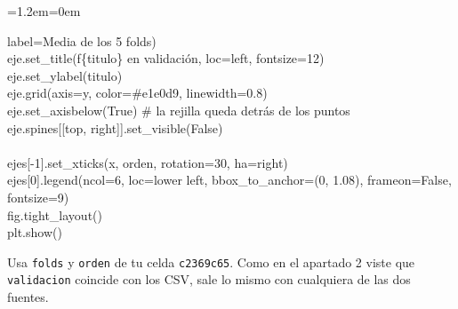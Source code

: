 \documentclass[11pt,a4paper]{article}
\newenvironment{codigo}
  {\par\smallskip\begin{list}{}{\leftmargin=1.2em\rightmargin=0em}\item\relax\ttfamily\scriptsize\raggedright}
  {\end{list}\smallskip}
\begin{document}
{\begin{codigo}
\hspace*{8.32em}label=\textquotedbl{}Media de los 5 folds\textquotedbl{}) \\{}
\hspace*{2.08em}eje.set\_\allowbreak{}title(f\textquotedbl{}\{titulo\} en validación\textquotedbl{}, loc=\textquotedbl{}left\textquotedbl{}, fontsize=12) \\{}
\hspace*{2.08em}eje.set\_\allowbreak{}ylabel(titulo) \\{}
\hspace*{2.08em}eje.grid(axis=\textquotedbl{}y\textquotedbl{}, color=\textquotedbl{}\#e1e0d9\textquotedbl{}, linewidth=0.8) \\{}
\hspace*{2.08em}eje.set\_\allowbreak{}axisbelow(True)                       \# la rejilla queda detrás de los puntos \\{}
\hspace*{2.08em}eje.spines[[\textquotedbl{}top\textquotedbl{}, \textquotedbl{}right\textquotedbl{}]].set\_\allowbreak{}visible(False) \\{}
\mbox{} \\{}
ejes[-1].set\_\allowbreak{}xticks(x, orden, rotation=30, ha=\textquotedbl{}right\textquotedbl{}) \\{}
ejes[0].legend(ncol=6, loc=\textquotedbl{}lower left\textquotedbl{}, bbox\_\allowbreak{}to\_\allowbreak{}anchor=(0, 1.08), frameon=False, fontsize=9) \\{}
fig.tight\_\allowbreak{}layout() \\{}
plt.show()
\end{codigo}
Usa \texttt{folds} y \texttt{orden} de tu celda \texttt{c2369c65}. Como en el apartado 2 viste que \texttt{validacion} coincide con los CSV, sale lo mismo con cualquiera de las dos fuentes.

}
\end{document}
